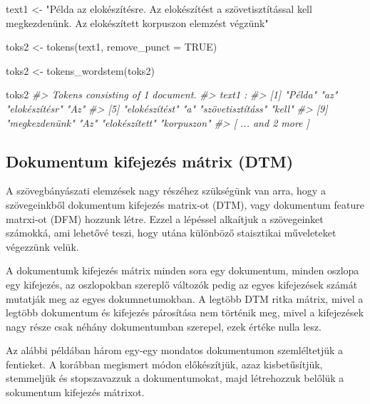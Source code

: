 \documentclass[
]{book}
\newenvironment{Shaded}{\begin{snugshade}}{\end{snugshade}}
\newcommand{\AttributeTok}[1]{\textcolor[rgb]{0.77,0.63,0.00}{#1}}
\newcommand{\CommentTok}[1]{\textcolor[rgb]{0.56,0.35,0.01}{\textit{#1}}}
\newcommand{\ConstantTok}[1]{\textcolor[rgb]{0.00,0.00,0.00}{#1}}
\newcommand{\FunctionTok}[1]{\textcolor[rgb]{0.00,0.00,0.00}{#1}}
\newcommand{\NormalTok}[1]{#1}
\newcommand{\OtherTok}[1]{\textcolor[rgb]{0.56,0.35,0.01}{#1}}
\newcommand{\StringTok}[1]{\textcolor[rgb]{0.31,0.60,0.02}{#1}}
\begin{document}
\begin{Shaded}
\begin{Highlighting}[]

\NormalTok{text1 }\OtherTok{\textless{}{-}} \StringTok{"Példa az elokészítésre. Az elokészítést a szövetisztítással kell megkezdenünk. Az elokészített korpuszon elemzést végzünk"}

\NormalTok{toks2 }\OtherTok{\textless{}{-}} \FunctionTok{tokens}\NormalTok{(text1, }\AttributeTok{remove\_punct =} \ConstantTok{TRUE}\NormalTok{)}

\NormalTok{toks2 }\OtherTok{\textless{}{-}} \FunctionTok{tokens\_wordstem}\NormalTok{(toks2)}

\NormalTok{toks2}
\CommentTok{\#\textgreater{} Tokens consisting of 1 document.}
\CommentTok{\#\textgreater{} text1 :}
\CommentTok{\#\textgreater{}  [1] "Példa"           "az"              "elokészítésr"    "Az"             }
\CommentTok{\#\textgreater{}  [5] "elokészítést"    "a"               "szövetisztításs" "kell"           }
\CommentTok{\#\textgreater{}  [9] "megkezdenünk"    "Az"              "elokészített"    "korpuszon"      }
\CommentTok{\#\textgreater{} [ ... and 2 more ]}
\end{Highlighting}
\end{Shaded}

\hypertarget{dokumentum-kifejezuxe9s-muxe1trix-dtm}{%
\subsection{Dokumentum kifejezés mátrix
(DTM)}\label{dokumentum-kifejezuxe9s-muxe1trix-dtm}}

A szövegbányászati elemzések nagy részéhez szükségünk van arra, hogy a
szövegeinkből dokumentum kifejezés matrix-ot (DTM), vagy dokumentum
feature matrxi-ot (DFM) hozzunk létre. Ezzel a lépéssel alkaítjuk a
szövegeinket számokká, ami lehetővé teszi, hogy utána különböző
staisztikai műveleteket végezzünk velük.

A dokumentumk kifejezés mátrix minden sora egy dokumentum, minden
oszlopa egy kifejezés, az oszlopokban szereplő változók pedig az egyes
kifejezések számát mutatják meg az egyes dokumnetumokban. A legtöbb DTM
ritka mátrix, mivel a legtöbb dokumentum és kifejezés párosítása nem
történik meg, mivel a kifejezések nagy része csak néhány dokumentumban
szerepel, ezek értéke nulla lesz.

Az alábbi példában három egy-egy mondatos dokumentumon szemléltetjük a
fentieket. A korábban megismert módon előkészítjük, azaz kisbetűsítjük,
stemmeljük és stopszavazzuk a dokumentumokat, majd létrehozzuk belőlük a
sokumentum kifejezés mátrixot.
\end{document}
